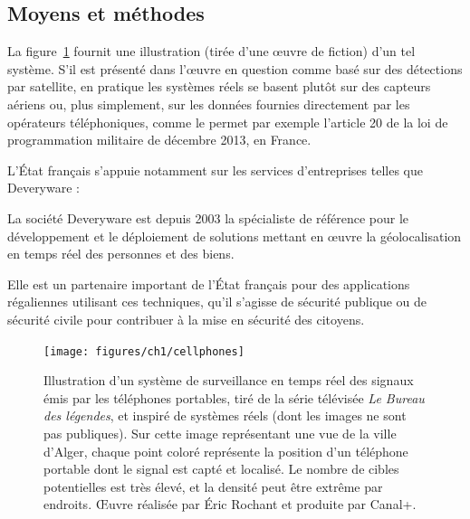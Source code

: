 	
	\subsection{Moyens et méthodes}
	La figure~\ref{fig:cellphones} fournit une illustration (tirée d'une œuvre de fiction) d'un tel système. S'il est présenté dans l'œuvre en question comme basé sur des détections par satellite, en pratique les systèmes réels se basent plutôt sur des capteurs aériens ou, plus simplement, sur les données fournies directement par les opérateurs téléphoniques, comme le permet par exemple l'article 20 de la loi de programmation militaire de décembre 2013, en France\footnotemark.
	
	
	L'État français s'appuie notamment sur les services d'entreprises telles que Deveryware :
	
	\begin{displayquote}
	    La société Deveryware est depuis 2003 la spécialiste de référence pour le développement et le déploiement de solutions mettant en œuvre la géolocalisation en temps réel des personnes et des biens.

        Elle est un partenaire important de l'État français pour des applications régaliennes utilisant ces techniques, qu'il s'agisse de sécurité publique ou de sécurité civile pour contribuer à la mise en sécurité des citoyens.\footnotemark
	\end{displayquote}
	
	
	\begin{figure}[H]
		\centering
		\texttt{[image: figures/ch1/cellphones]}
		\caption[Surveillance des signaux de téléphones portables.]{Illustration d'un système de surveillance en temps réel des signaux émis par les téléphones portables, tiré de la série télévisée \emph{Le Bureau des légendes}, et inspiré de systèmes réels (dont les images ne sont pas publiques). Sur cette image représentant une vue de la ville d'Alger, chaque point coloré représente la position d'un téléphone portable dont le signal est capté et localisé. Le nombre de cibles potentielles est très élevé, et la densité peut être extrême par endroits. \OE{}uvre réalisée par Éric Rochant et produite par Canal+.}
		\label{fig:cellphones}
	\end{figure}
	
